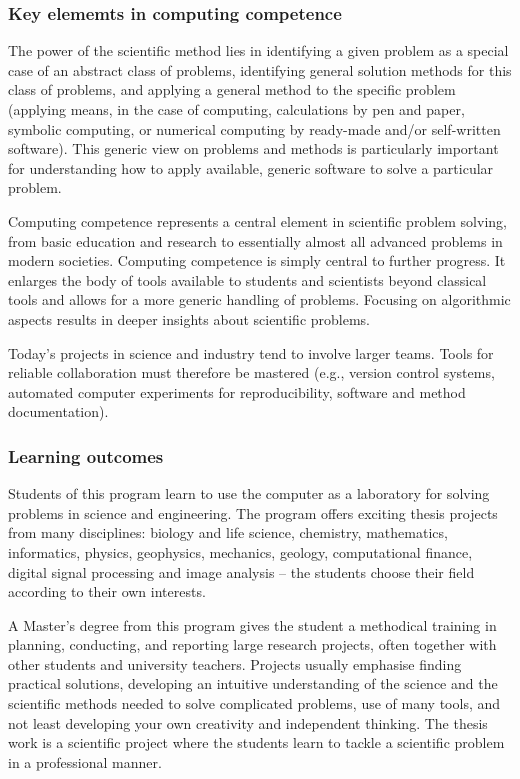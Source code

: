 \documentclass{beamer}
\begin{document}
\begin{frame}
\frametitle{Key elememts in computing competence}

\begin{block}{}
The power of the scientific method lies in identifying a given problem
as a special case of an abstract class of problems, identifying
general solution methods for this class of problems, and applying a
general method to the specific problem (applying means, in the case of
computing, calculations by pen and paper, symbolic computing, or
numerical computing by ready-made and/or self-written software). This
generic view on problems and methods is particularly important for
understanding how to apply available, generic software to solve a
particular problem.  


Computing competence represents a central element
in scientific problem solving, from basic education and research to
essentially almost all advanced problems in modern
societies. Computing competence is simply central to further
progress. It enlarges the body of tools available to students and
scientists beyond classical tools and allows for a more generic
handling of problems. Focusing on algorithmic aspects results in
deeper insights about scientific problems.

Today's projects in science and industry tend to involve larger teams. Tools for reliable collaboration must therefore be mastered (e.g., version control systems, automated computer experiments for reproducibility, software and method documentation).
\end{block}
\end{frame}

\begin{frame}
\frametitle{Learning outcomes}

\begin{block}{}
Students of this program learn to use the computer as a laboratory for solving problems in science and engineering. The program offers exciting thesis projects from many disciplines: biology and life science, chemistry, mathematics, informatics, physics, geophysics, mechanics, geology, computational finance, digital signal processing and image analysis  – the students choose their  field according to their own interests. 

A Master’s degree from this program gives the student   a methodical training in planning, conducting, and reporting large research projects, often together with other students and university teachers. 
Projects usually emphasise finding practical solutions,
developing an intuitive understanding of the science and the
scientific methods needed to solve complicated problems, use of many
tools, and not least developing your own creativity and independent
thinking. The thesis work is a scientific project where the students learn to
tackle a scientific problem in a professional manner.
\end{block}
\end{frame}
\end{document}
